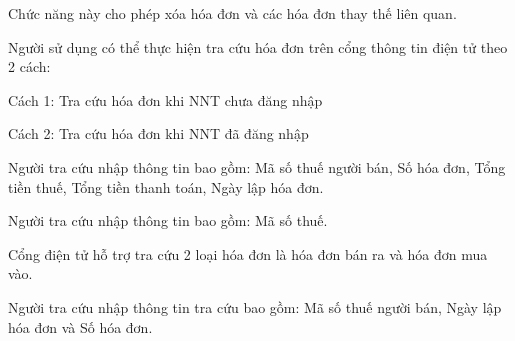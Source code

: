 Chức năng này cho phép xóa hóa đơn và các hóa đơn thay thế liên quan.


Người sử dụng có thể thực hiện tra cứu hóa đơn trên cổng thông tin điện tử theo 2 cách:

Cách 1: Tra cứu hóa đơn khi NNT chưa đăng nhập

Cách 2: Tra cứu hóa đơn khi NNT đã đăng nhập



Người tra cứu nhập thông tin bao gồm: Mã số thuế người bán, Số hóa đơn, Tổng tiền thuế, Tổng tiền thanh toán, Ngày lập hóa đơn.






Người tra cứu nhập thông tin bao gồm: Mã số thuế.





Cổng điện tử hỗ trợ tra cứu 2 loại hóa đơn là hóa đơn bán ra và hóa đơn mua vào.

Người tra cứu nhập thông tin tra cứu bao gồm: Mã số thuế người bán, Ngày lập hóa đơn và Số hóa đơn.

